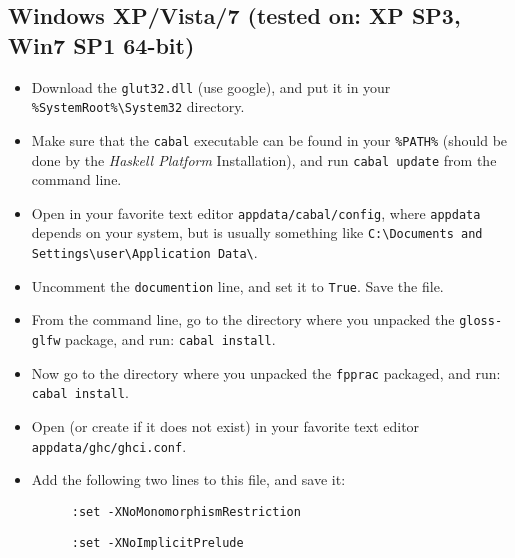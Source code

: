 \documentclass[]{article}
\begin{document}
\subsection{Windows XP/Vista/7 (tested on: XP SP3, Win7 SP1 64-bit)}
\begin{itemize}
  \item Download the \verb!glut32.dll! (use google), and put it in your \verb!%SystemRoot%\System32! directory.
  \item Make sure that the \verb!cabal! executable can be found in your \verb!%PATH%! (should be done by the \emph{Haskell Platform} Installation), and run \verb!cabal update! from the command line.
  \item Open in your favorite text editor \verb!appdata/cabal/config!, where \verb!appdata! depends on your system, but is usually something like \verb!C:\Documents and Settings\user\Application Data\!.
  \item Uncomment the \verb!documention! line, and set it to \verb!True!. Save the file.
  \item From the command line, go to the directory where you unpacked the \verb!gloss-glfw! package, and run: \verb!cabal install!.
  \item Now go to the directory where you unpacked the \verb!fpprac! packaged, and run: \verb!cabal install!.
  \item Open (or create if it does not exist) in your favorite text editor \verb!appdata/ghc/ghci.conf!.
  \item Add the following two lines to this file, and save it:
  \begin{description}
    \item[] \verb!:set -XNoMonomorphismRestriction!
    \item[] \verb!:set -XNoImplicitPrelude!
  \end{description}
\end{itemize}
\end{document}

